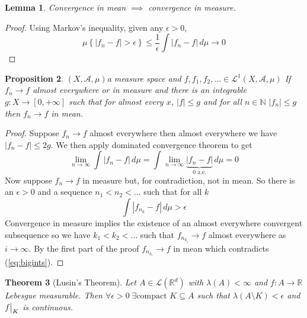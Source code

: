 \documentclass[11pt]{article}
\newcommand{\abs}[1]{|#1|}
\newcommand{\msrspc}{\ensuremath{(X,\mathcal{A},\mu)}}
\newcommand{\dm}{\ensuremath{\,d\mu}}
\newcommand\restr[2]{{%
  \left.\kern-\nulldelimiterspace %
  #1 %
  \vphantom{\big|} %
  \right|_{#2} %
  }}
\newcommand{\R}{\mathbb{R}}
\newcommand{\N}{\mathbb{N}}
\newtheorem{theorem}{Theorem}[section]
\newtheorem{prop}[theorem]{Proposition}
\newtheorem{lemma}[theorem]{Lemma}
\begin{document}
\begin{lemma}
Convergence in mean $\implies$ convergence in measure.
\end{lemma}
\begin{proof}
Using Markov's inequality, given any $\epsilon >0$,
\[
	\mu\left\{\abs{f_n-f} > \epsilon\right\}\leq \frac{1}{\epsilon}\int\abs{f_n-f}\dm\to 0
\]
\end{proof}
\begin{prop}
\msrspc a measure space and $f, f_1, f_2, \dots\in \mathcal{L}^1(X, \mathcal{A}, \mu)$ If $f_n\to f$ almost everywhere or in measure and there is an integrable $g:X \to [0, + \infty]$ such that for almost every $x$, $\abs{f}\leq g$ and for all $n\in\N$ $\abs{f_n}\leq g$ then $f_n \to f$ in mean.
\end{prop}
\begin{proof}
Suppose $f_n\to f$ almost everywhere then almost everywhere we have $\abs{f_n -f}\leq 2g$.
We then apply dominated convergence theorem to get
\[
	\lim_{n\to\infty}\int\abs{f_n-f}\dm=\int\lim_{n\to\infty}\underbrace{\abs{f_n-f}}_{\text{0 a.e.}}\dm = 0
\]
Now suppose $f_n\to f$ in measure but, for contradiction, not in mean.
So there is an $\epsilon > 0$ and a sequence $n_1 < n_2 < \dots $ such that for all $k$
\begin{equation}
	\int\abs{f_{n_k}-f}\dm > \epsilon
	\label{eq:bigints}
\end{equation}
Convergence in measure implies the existence of an almost everywhere convergent subsequence so we have $k_1 < k_2 < \dots$ such that $f_{n_{k_i}}\to f$ almost everywhere as $i\to\infty$.
By the first part of the proof $f_{n_{k_i}}\to f$ in mean which contradicts (\ref{eq:bigints}).
\end{proof}
\begin{theorem}[Lusin's Theorem]
Let $A\in\mathcal{L}(\R^d)$ with $\lambda(A)< \infty$ and $f:A\to \R$ Lebesgue measurable.
Then $\forall\epsilon>0\;\exists\text{compact }K\subseteq A$ such that $\lambda(A\setminus K)< \epsilon$ and $\restr{f}{K}$ is continuous.
\end{theorem}
\end{document}
